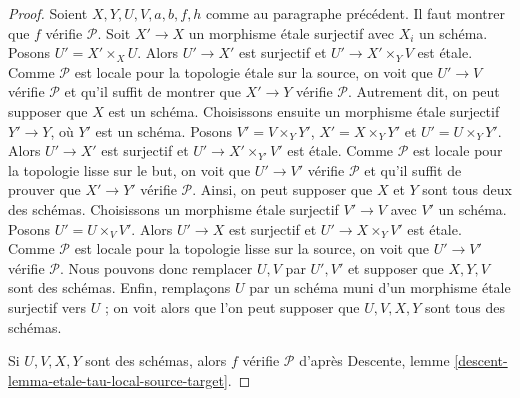 \begin{proof}
\medskip\noindent
Soient $X, Y, U, V, a, b, f, h$ comme au paragraphe précédent. Il faut
montrer que $f$ vérifie $\mathcal{P}$. Soit $X' \to X$ un morphisme \'etale surjectif
avec $X_i$ un schéma. Posons $U' = X' \times_X U$. Alors
$U' \to X'$ est surjectif et $U' \to X' \times_Y V$ est \'etale.
Comme $\mathcal{P}$ est locale pour la topologie \'etale sur la source, on voit que
$U' \to V$ vérifie $\mathcal{P}$ et qu'il suffit de montrer que
$X' \to Y$ vérifie $\mathcal{P}$. Autrement dit, on peut supposer
que $X$ est un schéma. Choisissons ensuite un morphisme \'etale surjectif
$Y' \to Y$, où $Y'$ est un schéma. Posons $V' = V \times_Y Y'$,
$X' = X \times_Y Y'$ et $U' = U \times_Y Y'$. Alors
$U' \to X'$ est surjectif et $U' \to X' \times_{Y'} V'$ est \'etale.
Comme $\mathcal{P}$ est locale pour la topologie lisse sur le but, on voit que $U' \to V'$ vérifie
$\mathcal{P}$ et qu'il suffit de prouver que $X' \to Y'$ vérifie $\mathcal{P}$.
Ainsi, on peut supposer que $X$ et $Y$ sont tous deux des schémas.
Choisissons un morphisme \'etale surjectif $V' \to V$
avec $V'$ un schéma. Posons $U' = U \times_V V'$.
Alors $U' \to X$ est surjectif et $U' \to X \times_Y V'$ est \'etale.
Comme $\mathcal{P}$ est locale pour la topologie lisse sur la source, on voit que
$U' \to V'$ vérifie $\mathcal{P}$. Nous pouvons donc remplacer $U, V$ par
$U', V'$ et supposer que $X, Y, V$ sont des schémas.
Enfin, remplaçons $U$ par un schéma muni d'un morphisme \'etale surjectif vers $U$ ;
on voit alors que l'on peut supposer que $U, V, X, Y$ sont tous des schémas.

\medskip\noindent
Si $U, V, X, Y$ sont des schémas, alors $f$ vérifie $\mathcal{P}$
d'après Descente, lemme \ref{descent-lemma-etale-tau-local-source-target}.
\end{proof}

